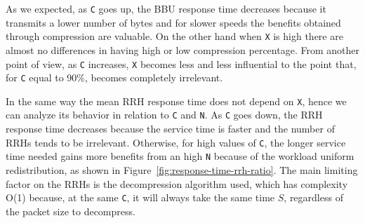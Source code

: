 \documentclass[11pt,a4paper,oneside, openright]{article}
\begin{document}
As we expected, as \texttt{C} goes up, the BBU response time decreases because it transmits a lower number of bytes and for slower speeds the benefits obtained through compression are valuable. On the other hand when \texttt{X} is high there are almost no differences in having high or low compression percentage. %
From another point of view, as \texttt{C} increases, \texttt{X} becomes less and less influential to the point that, for \texttt{C} equal to 90\%, becomes completely irrelevant.

In the same way the mean RRH response time does not depend on \texttt{X}, hence we can analyze its behavior in relation to \texttt{C} and \texttt{N}.
As \texttt{C} goes down, the RRH response time decreases because the service time is faster and the number of RRHs tends to be irrelevant. Otherwise, for high values of \texttt{C}, the longer service time needed gains more benefits from an high \texttt{N} because of the workload uniform redistribution, as shown in Figure~\ref{fig:response-time-rrh-ratio}.
The main limiting factor on the RRHs is the decompression algorithm used, which has complexity O(1) because, at the same \texttt{C}, it will always take the same time $ S $, regardless of the packet size to decompress.
\end{document}
